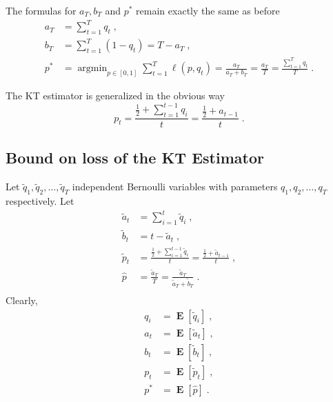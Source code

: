 \documentclass{article}
\DeclareMathOperator*{\argmin}{argmin}
\DeclareMathOperator*{\Exp}{\mathbf{E}}
\begin{document}
The formulas for $a_T, b_T$ and $p^*$ remain exactly the same as before
\begin{align*}
a_T & = \sum_{t=1}^T q_t \; , \\
b_T & = \sum_{t=1}^T (1 - q_t) = T - a_T \; , \\
p^* & =  \argmin_{p \in [0,1]} \sum_{t=1}^T \ell(p, q_t) = \frac{a_T}{a_T + b_T} = \frac{a_T}{T} = \frac{\sum_{t=1}^T q_t}{T} \; .
\end{align*}

The KT estimator is generalized in the obvious way
$$
p_t = \frac{\frac{1}{2} + \sum_{t=1}^{t-1} q_i}{t} = \frac{\frac{1}{2} + a_{t-1}}{t} \; .
$$

\subsection{Bound on loss of the KT Estimator}

Let $\widetilde q_1, \widetilde q_2, \dots, \widetilde q_T$ independent
Bernoulli variables with parameters $q_1, q_2, \dots, q_T$ respectively.
Let
\begin{align*}
\widetilde a_t & = \sum_{i=1}^t \widetilde q_i  \; , \\
\widetilde b_t & = t - \widetilde a_t \; , \\
\widetilde p_t & = \frac{\frac{1}{2} + \sum_{i=1}^{t-1} \widetilde q_i}{t} = \frac{\frac{1}{2} + \widetilde a_{t-1}}{t} \; , \\
\widehat p & = \frac{\widetilde a_T}{T} = \frac{\widetilde a_T}{\widetilde a_T + \widetilde b_T} \; . \\
\end{align*}
Clearly,
\begin{align*}
q_i & = \Exp[\widetilde q_i] \; , \\
a_t & = \Exp[\widetilde a_t] \; , \\
b_t & = \Exp[\widetilde b_t] \; , \\
p_t & = \Exp[\widetilde p_t] \; , \\
p^* & = \Exp[\widehat p] \; .
\end{align*}
\end{document}

